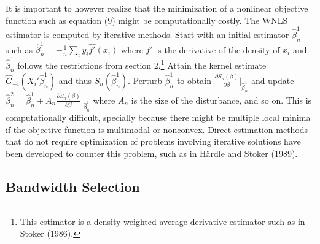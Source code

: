 \documentclass[a4paper]{article}
\begin{document}
It is important to however realize that the minimization of a nonlinear objective function such as equation (9) might be computationally costly. The WNLS estimator is computed by iterative methods. Start with an initial estimator $\hat{\beta}_n^{1}$ such as $\hat{\beta}_n^{1} = - \frac{1}{n}\sum_i y_i\hat{f'}(x_i)$ where $f'$ is the derivative of the density of $x_i$ and $\hat{\beta}_n^{1}$ follows the restrictions from section 2.\footnote{This estimator is a density weighted average derivative estimator such as in Stoker (1986).} Attain the kernel estimate $\hat{G}_{-i}(X_i'\hat{\beta}_n^{1})$ and thus $S_n(\hat{\beta}_n^{1})$. Perturb $\hat{\beta}_n^{1}$ to obtain $\frac{\partial S_n(\beta)}{\partial\beta} |_{\hat{\beta}_n^{1}}$ and update $\hat{\beta}_n^{2} = \hat{\beta}_n^{1} + A_n  \frac{ \partial S_n(\beta)}{\partial\beta}|_{\hat{\beta}_n^{1}}$ where $A_n$ is the size of the disturbance, and so on. This is computationally difficult, specially because there might be multiple local minima if the objective function is multimodal or nonconvex. Direct estimation methods that do not require optimization of problems involving iterative solutions have been developed to counter this problem, such as in H{\"a}rdle and Stoker (1989).













\subsection{Bandwidth Selection} %
\label{sub:Bandwidth Selection}
\end{document}

